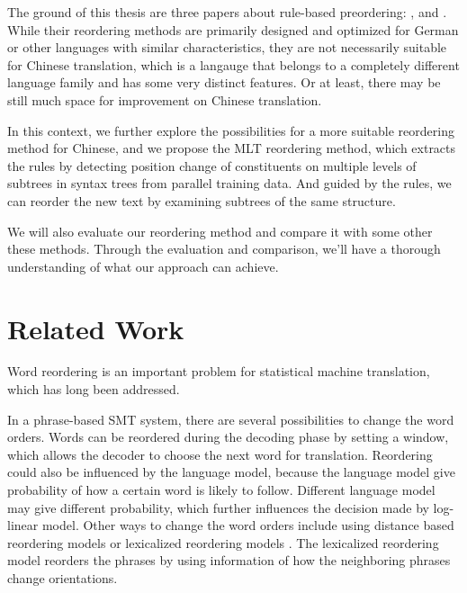 The ground of this thesis are three papers about rule-based preordering: \cite{short}, \cite{long} and \cite{tree}. While their reordering methods are primarily designed and optimized for German or other languages with similar characteristics, they are not necessarily suitable for Chinese translation, which is a langauge that belongs to a completely different language family and has some very distinct features. Or at least, there may be still much space for improvement on Chinese translation.

In this context, we further explore the possibilities for a more suitable reordering method for Chinese, and we propose the MLT reordering method, which extracts the rules by detecting position change of constituents on multiple levels of subtrees in syntax trees from parallel training data. And guided by the rules, we can reorder the new text by examining subtrees of the same structure.

We will also evaluate our reordering method and compare it with some other these methods. Through the evaluation and comparison, we'll have a thorough understanding of what our approach can achieve.





\section{Related Work}
\label{ch:Introduction:sec:RelatedWork}

Word reordering is an important problem for statistical machine translation, which has long been addressed.

In a phrase-based SMT system, there are several possibilities to change the word orders. Words can be reordered during the decoding phase by setting a window, which allows the decoder to choose the next word for translation. Reordering could also be influenced by the language model, because the language model give probability of how a certain word is likely to follow. Different language model may give different probability, which further influences the decision made by log-linear model. Other ways to change the word orders include using distance based reordering models or lexicalized reordering models \citep{tillmann2004, koehn2005}. The lexicalized reordering model reorders the phrases by using information of how the neighboring phrases change orientations.

